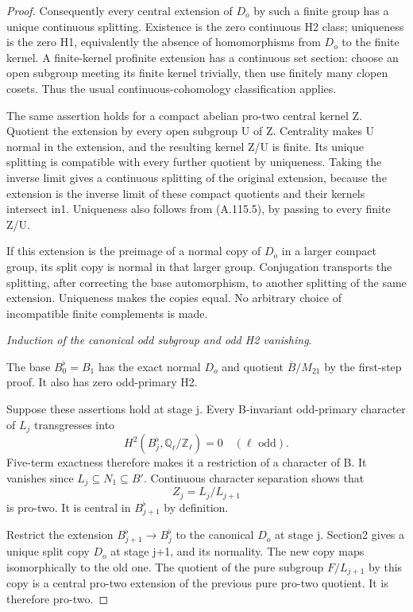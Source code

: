 \begin{proof}
Consequently every central extension of \(D_o\) by such a finite group has a unique continuous splitting. Existence is the zero continuous H2 class; uniqueness is the zero H1, equivalently the absence of homomorphisms from \(D_o\) to the finite kernel. A finite-kernel profinite extension has a continuous set section: choose an open subgroup meeting its finite kernel trivially, then use finitely many clopen cosets. Thus the usual continuous-cohomology classification applies.

The same assertion holds for a compact abelian pro-two central kernel Z. Quotient the extension by every open subgroup U of Z. Centrality makes U normal in the extension, and the resulting kernel Z/U is finite. Its unique splitting is compatible with every further quotient by uniqueness. Taking the inverse limit gives a continuous splitting of the original extension, because the extension is the inverse limit of these compact quotients and their kernels intersect in1. Uniqueness also follows from (A.115.5), by passing to every finite Z/U.

If this extension is the preimage of a normal copy of \(D_o\) in a larger compact group, its split copy is normal in that larger group. Conjugation transports the splitting, after correcting the base automorphism, to another splitting of the same extension. Uniqueness makes the copies equal. No arbitrary choice of incompatible finite complements is made.

\medskip\noindent\emph{Induction of the canonical odd subgroup and odd H2 vanishing}.

The base \(B_0^\flat=B_1\) has the exact normal \(D_o\) and quotient \(\overline B/M_{21}\) by the first-step proof. It also has zero odd-primary H2.

Suppose these assertions hold at stage j. Every B-invariant odd-primary character of \(L_j\) transgresses into
\[
H^2(B_j^\flat,\mathbb Q_\ell/\mathbb Z_\ell)=0
\quad(\ell\text{ odd}).
\]
Five-term exactness therefore makes it a restriction of a character of B. It vanishes since \(L_j\subseteq N_1\subseteq B'\). Continuous character separation shows that
\[
Z_j=L_j/L_{j+1}
\]
is pro-two. It is central in \(B_{j+1}^\flat\) by definition.

Restrict the extension \(B_{j+1}^\flat\to B_j^\flat\) to the canonical \(D_o\) at stage j. Section2 gives a unique split copy \(D_o\) at stage j+1, and its normality. The new copy maps isomorphically to the old one. The quotient of the pure subgroup \(F/L_{j+1}\) by this copy is a central pro-two extension of the previous pure pro-two quotient. It is therefore pro-two.


\end{proof}
